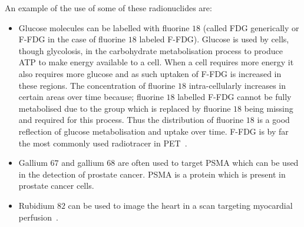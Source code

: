                 An example of the use of some of these radionuclides are:
                
                \begin{itemize}
                    \item Glucose molecules can be labelled with fluorine $18$ (called \gls{FDG} generically or \gls{F-FDG} in the case of fluorine $18$ labeled \gls{F-FDG}). Glucose is used by cells, though glycolosis, in the carbohydrate metabolisation process to produce \gls{ATP} to make energy available to a cell. When a cell requires more energy it also requires more glucose and as such uptaken of \gls{F-FDG} is increased in these regions. The concentration of fluorine $18$ intra-cellularly increases in certain areas over time because; fluorine $18$ labelled \gls{F-FDG} cannot be fully metabolised due to the group which is replaced by fluorine $18$ being missing and required for this process. Thus the distribution of fluorine $18$ is a good reflection of glucose metabolisation and uptake over time. \gls{F-FDG} is by far the most commonly used radiotracer in \gls{PET}~.
                    
                    \item Gallium $67$ and gallium $68$ are often used to target \gls{PSMA} which can be used in the detection of prostate cancer. \gls{PSMA} is a protein which is present in prostate cancer cells.
                    
                    \item Rubidium $82$ can be used to image the heart in a scan targeting myocardial perfusion~.
                \end{itemize}
            
